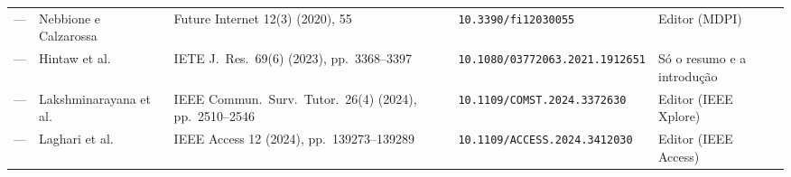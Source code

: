 {\begin{longtable}{@{}lL{3.0cm}L{4.4cm}L{3.3cm}L{3.2cm}@{}}
--- & Nebbione e Calzarossa~\cite{nebbione2020security} & Future Internet 12(3) (2020), 55 &
  \texttt{10.3390/fi12030055} & Editor (MDPI) \\
--- & Hintaw et al.~\cite{hintaw2023mqtt} & IETE J.\ Res.\ 69(6) (2023), pp.~3368--3397 &
  \texttt{10.1080/03772063.2021.1912651} & Só o resumo e a introdução \\
--- & Lakshminarayana et al.~\cite{lakshminarayana2024securing} & IEEE Commun.\ Surv.\ Tutor.\ 26(4) (2024), pp.~2510--2546 &
  \texttt{10.1109/COMST.2024.3372630} & Editor (IEEE Xplore) \\
--- & Laghari et al.~\cite{laghari2024securing} & IEEE Access 12 (2024), pp.~139273--139289 &
  \texttt{10.1109/ACCESS.2024.3412030} & Editor (IEEE Access) \\
\end{longtable}
}
